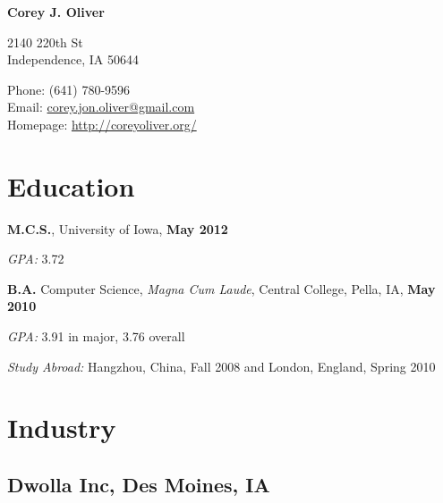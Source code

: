 \documentclass[10pt,letterpaper]{article}
\def\name{Corey J. Oliver}
\renewenvironment{itemize}{
  \begin{list}{}{
      \setlength{\leftmargin}{1.5em}
      \setlength{\itemsep}{0.25em}
      \setlength{\parskip}{0pt}
      \setlength{\parsep}{0.25em}
    }
  }{
  \end{list}
}
\newcommand{\yearrange}[1]{\hfill \textbf{#1} \par}
\begin{document}

\centerline{\huge \bf \name}

\bigskip

\noindent
\begin{minipage}[t]{0.49\textwidth}
  2140 220th St\\
  Independence, IA 50644
\end{minipage}
\begin{minipage}[t]{0.5\textwidth}
  \hfill Phone: (641) 780-9596 \\ %
  \hspace*{0pt} \hfill Email: \href{mailto:corey.jon.oliver@gmail.com}{corey.jon.oliver@gmail.com} \\
  \hspace*{0pt} \hfill Homepage: \href{http://coreyoliver.org/}{http://coreyoliver.org/}
\end{minipage}

\section*{Education}

\begin{itemize}
\item \textbf{M.C.S.}, University of Iowa, \yearrange{May 2012}
  \begin{itemize}
  \item \textit{GPA:}
    3.72
  \end{itemize}
\item \textbf{B.A.} Computer Science, \textit{Magna Cum Laude}, Central
  College, Pella, IA, \yearrange{May 2010}
  \begin{itemize}
  \item \textit{GPA:}
    3.91 in major, 3.76 overall
  \item \textit{Study Abroad:} Hangzhou, China, Fall 2008 and
    London, England, Spring 2010
  \end{itemize}
\end{itemize}

\section*{Industry}

\subsection*{Dwolla Inc, Des Moines, IA}
\end{document}
